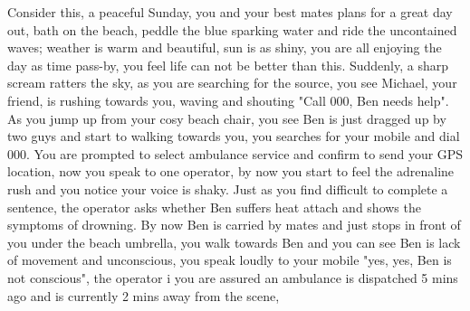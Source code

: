 Consider this, a peaceful Sunday, you and your best mates plans for a great day out, bath on the beach, peddle the blue sparking water and ride the uncontained waves; weather is warm and beautiful, sun is as shiny, you are all enjoying the day as time pass-by, you feel life can not be better than this. Suddenly, a sharp scream ratters the sky, as you are searching for the source, you see Michael, your friend, is rushing towards you, waving and shouting "Call 000, Ben needs help". As you jump up from your cosy beach chair, you see Ben is just dragged up by two guys and start to walking towards you, you searches for your mobile and dial 000. You are prompted to select ambulance service and confirm to send your GPS location, now you speak to one operator, by now you start to feel the adrenaline rush and you notice your voice is shaky. Just as you find difficult to complete a sentence, the operator asks whether Ben suffers heat attach and shows the symptoms of drowning. By now Ben is carried by mates and just stops in front of you under the beach umbrella, you walk towards Ben and you can see Ben is lack of movement and unconscious, you speak loudly to your mobile "yes, yes, Ben is not conscious", the operator i you are assured an ambulance is dispatched 5 mins ago and is currently 2 mins away from the scene, 